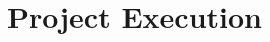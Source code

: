 \documentclass[ %
                author={Finn Alexander Wilkinson},
                supervisor={Dr. Andrew Calway},
                degree={MEng},
                title={\centering A Mixed Reality Aim Assistant for Pool and Snooker},
                subtitle={},
                type={Enterprise},
                year={2021} ]{dissertation}
\begin{document}




\chapter{Project Execution}
\label{chap:execution}




\end{document}
